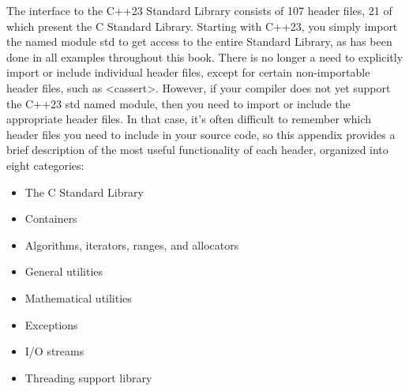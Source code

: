 The interface to the C++23 Standard Library consists of 107 header files, 21 of which present the C Standard Library. Starting with C++23, you simply import the named module std to get access to the entire Standard Library, as has been done in all examples throughout this book. There is no longer a need to explicitly import or include individual header files, except for certain non-importable header files, such as <cassert>. However, if your compiler does not yet support the C++23 std named module, then you need to import or include the appropriate header files. In that case, it’s often difficult to remember which header files you need to include in your source code, so this appendix provides a brief description of the most useful functionality of each header, organized into eight categories:

\begin{itemize}
\item
The C Standard Library

\item
Containers

\item
Algorithms, iterators, ranges, and allocators

\item
General utilities

\item
Mathematical utilities

\item
Exceptions

\item
I/O streams

\item
Threading support library
\end{itemize}
